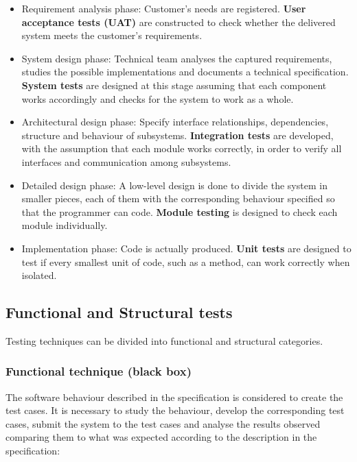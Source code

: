 \begin{itemize}

\item Requirement analysis phase: Customer's needs are registered. \textbf{User acceptance tests (UAT)} are constructed to check whether the delivered system meets the customer's requirements.

\item System design phase: Technical team analyses the captured requirements, studies the possible implementations and documents a technical specification. \textbf{System tests} are designed at this stage assuming that each component works accordingly and checks for the system to work as a whole.

\item Architectural design phase: Specify interface relationships, dependencies, structure and behaviour of subsystems. \textbf{Integration tests} are developed, with the assumption that each module works correctly, in order to verify all interfaces and communication among subsystems.

\item Detailed design phase: A low-level design is done to divide the system in smaller pieces, each of them with the corresponding behaviour specified so that the programmer can code. \textbf{Module testing} is designed to check each module individually.

\item Implementation phase: Code is actually produced. \textbf{Unit tests} are designed to test if every smallest unit of code, such as a method, can work correctly when isolated.
 
\end{itemize}

\subsection{Functional and Structural tests}

Testing techniques can be divided into functional and structural categories.

\subsubsection{Functional technique (black box)}
\label{funcTests}

The software behaviour described in the specification is considered to create the test cases. It is necessary to study the behaviour, develop the corresponding test cases, submit the system to the test cases and analyse the results observed comparing them to what was expected according to the description in the specification\cite{introSoftTest}:

